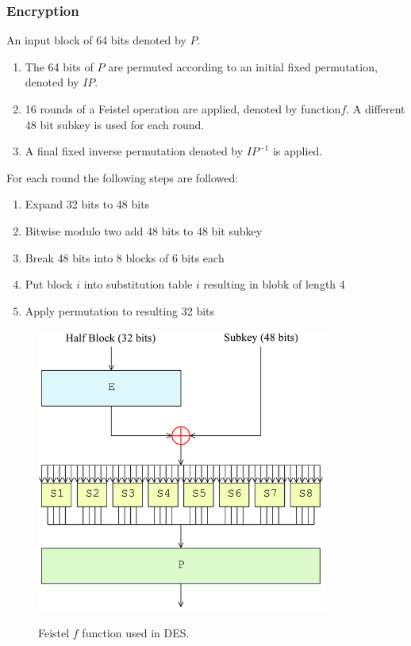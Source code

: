 \documentclass{article}
\begin{document}
\subsubsection{Encryption}

An input block of 64 bits denoted by $P$.

\begin{enumerate}
    \item The 64 bits of $P$ are permuted according to an initial fixed permutation, denoted by $IP$.
    \item 16 rounds of a Feistel operation are applied, denoted by function$f$. A different 48 bit subkey is used for each round.
    \item A final fixed inverse permutation denoted by $IP^{-1}$ is applied.
\end{enumerate}

For each round the following steps are followed:
\begin{enumerate}
    \item Expand 32 bits to 48 bits
    \item Bitwise modulo two add 48 bits to 48 bit subkey
    \item Break 48 bits into 8 blocks of 6 bits each
    \item Put block $i$ into substitution table $i$ resulting in blobk of length 4
    \item Apply permutation to resulting 32 bits
\end{enumerate}

\begin{figure}[H]
\centering
\includegraphics[scale=0.75]{Images/feistelround.png}
\label{fig:fround}
\caption{Feistel $f$ function used in DES.}
\end{figure}
\end{document}
